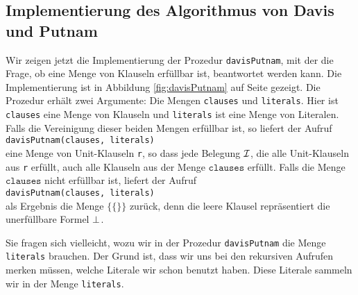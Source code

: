 \subsection{Implementierung des Algorithmus von Davis und Putnam}
Wir zeigen jetzt die Implementierung der Prozedur \texttt{davisPutnam}, 
mit der die Frage, ob eine Menge von Klauseln erf\"{u}llbar ist, beantwortet werden kann. Die
Implementierung ist in Abbildung \ref{fig:davisPutnam} auf Seite \pageref{fig:davisPutnam}
gezeigt.  Die Prozedur erh\"{a}lt zwei Argumente: Die Mengen \texttt{clauses} und \texttt{literals}.
Hier ist \texttt{clauses} eine Menge von Klauseln und \texttt{literals} ist eine Menge von
Literalen.  Falls  die Vereinigung dieser beiden Mengen erf\"{u}llbar ist, so liefert
der Aufruf 
\\[0.2cm]
\hspace*{1.3cm}
\texttt{davisPutnam(clauses, literals)} 
\\[0.2cm]
eine Menge von Unit-Klauseln \texttt{r}, so
dass jede Belegung $\mathcal{I}$, die alle Unit-Klauseln aus \texttt{r} erf\"{u}llt, auch alle Klauseln aus
der Menge  $\texttt{clauses}$ erf\"{u}llt.  Falls die Menge $\texttt{clauses}$ nicht erf\"{u}llbar ist, liefert der Aufruf
\\[0.2cm]
\hspace*{1.3cm}
\texttt{davisPutnam(clauses, literals)} 
\\[0.2cm]
als Ergebnis die Menge $\bigl\{ \{\} \bigr\}$ zur\"{u}ck,
denn die leere Klausel repr\"{a}sentiert die unerf\"{u}llbare Formel $\bot$.

Sie fragen sich vielleicht, wozu wir in der Prozedur \texttt{davisPutnam} die Menge
\texttt{literals} brauchen.  Der Grund ist, dass wir uns bei den rekursiven Aufrufen
merken m\"{u}ssen, welche Literale wir schon benutzt haben.  Diese Literale sammeln wir in der
Menge \texttt{literals}.

